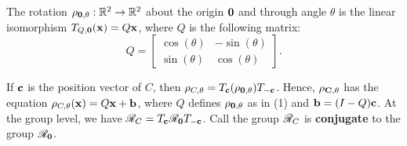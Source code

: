 \begin{theorem}
    \begin{statements}{}
        \item The rotation \(\rho_{\mathbf{0}, \theta}: \mathbb{R}^2 \to \mathbb{R}^2\) about the origin \(\mathbf{0}\) and through angle \(\theta\) is the linear isomorphism \(T_{Q, \mathbf{0}} (\mathbf{x}) = Q\mathbf{x}\), where \(Q\) is the following matrix:
        \[Q = \begin{bmatrix}
                \cos(\theta) & -\sin(\theta) \\
                \sin(\theta) & \cos(\theta)
            \end{bmatrix}.\]
        \item If \(\mathbf{c}\) is the position vector of \(C\), then \(\rho_{C, \theta} = T_{\mathbf{c}}(\rho_{\mathbf{0}, \theta})T_{-\mathbf{c}}\). Hence, \(\rho_{\mathbf{C}, \theta}\) has the equation \(\rho_{C, \theta}(\mathbf{x}) = Q\mathbf{x} + \mathbf{b}\), where \(Q\) defines \(\rho_{\mathbf{0}, \theta}\) as in (1) and \(\mathbf{b} = (I - Q)\mathbf{c}\). At the group level, we have \(\mathscr{R}_C = T_{\mathbf{c}}\mathscr{R}_{\mathbf{0}}T_{-\mathbf{c}}\). Call the group \(\mathscr{R}_C\) is \textbf{conjugate} to the group \(\mathscr{R}_{\mathbf{0}}\).
    \end{statements}
\end{theorem}